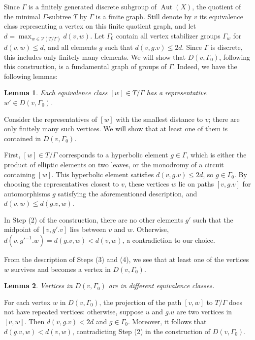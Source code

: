 \documentclass[12pt,leqno]{amsart}
\makeatletter
\renewenvironment{proof}[1][\proofname]{%
	\par
	\pushQED{\qed}%
	\normalfont
	\topsep6\p@\@plus6\p@\relax
	\trivlist
	\item[\hskip\labelsep\itshape #1\@addpunct{.}]%
	\ignorespaces
}{%
	\par\nobreak\vspace{2pt}%
	\popQED%
	\medskip%
	\endtrivlist
	\@endpefalse
}
\newcommand{\2}{L^2_{\rm per}(0, T)}
\newtheorem{lem}{Lemma}[section]
\newcommand{\aut}{{\operatorname{Aut}}}
\numberwithin{equation}{section}
\numberwithin{figure}{section}
\makeatother
\begin{document}
\begin{proof}
    Since $\Gamma$ is a finitely generated discrete subgroup of $\aut(X)$, the quotient of the minimal $\Gamma$-subtree $T$ by $\Gamma$ is a finite graph. Still denote by $v$ its equivalence class representing a vertex on this finite quotient graph, and let $d = \max_{w\in\mathcal{V}(T/\Gamma)}d(v,w)$. Let $\Gamma_0$ contain all vertex stabilizer groups $\Gamma_w$ for $d(v,w)\leq d$, and all elements $g$ such that $d(v,g.v)\leq 2d$. Since $\Gamma$ is discrete, this includes only finitely many elements. We will show that $D(v,\Gamma_0)$, following this construction, is a fundamental graph of groups of $\Gamma$. Indeed, we have the following lemmas:
    \begin{lem}
        Each equivalence class $[w]\in T/\Gamma$ has a representative $w'\in D(v,\Gamma_0)$.
    \end{lem}
    \begin{proof}
        Consider the representatives of $[w]$ with the smallest distance to $v$; there are only finitely many such vertices. We will show that at least one of them is contained in $D(v,\Gamma_0)$.

        First, $[w]\in T/\Gamma$ corresponds to a hyperbolic element $g\in \Gamma$, which is either the product of elliptic elements on two leaves, or the monodromy of a circuit containing $[w]$. This hyperbolic element satisfies $d(v,g.v)\leq 2d$, so $g\in \Gamma_0$. By choosing the representatives closest to $v$, these vertices $w$ lie on paths $[v,g.v]$ for automorphisms $g$ satisfying the aforementioned description, and $d(v,w)\leq d(g.v,w)$.

        In Step (2) of the construction, there are no other elements $g'$ such that the midpoint of $[v,g'.v]$ lies between $v$ and $w$. Otherwise, $d(v,g'^{-1}.w) = d(g.v,w)<d(v,w)$, a contradiction to our choice.

        From the description of Steps (3) and (4), we see that at least one of the vertices $w$ survives and becomes a vertex in $D(v,\Gamma_0)$.
    \end{proof}
    \begin{lem}
        Vertices in $D(v,\Gamma_0)$ are in different equivalence classes.
    \end{lem}
    \begin{proof}
        For each vertex $w$ in $D(v,\Gamma_0)$, the projection of the path $[v,w]$ to $T/\Gamma$ does not have repeated vertices: otherwise, suppose $u$ and $g.u$ are two vertices in $[v,w]$. Then $d(v,g.v)<2d$ and $g\in \Gamma_0$. Moreover, it follows that $d(g.v,w)<d(v,w)$, contradicting Step (2) in the construction of $D(v,\Gamma_0)$.


\end{proof}
\end{proof}
\end{document}
